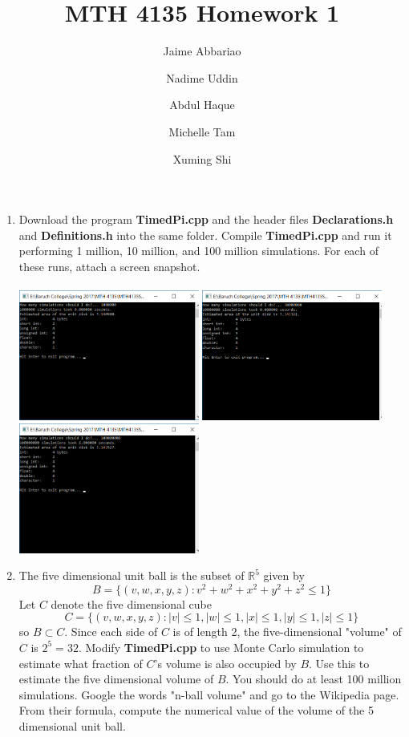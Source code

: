 \documentclass{article}
\author{Jaime Abbariao \and Nadime Uddin \and Abdul Haque \and Michelle Tam \and Xuming Shi}
\title{MTH 4135 Homework 1}
\date{}
\begin{document}
	\maketitle
	\begin{enumerate}
		\item Download the program \textbf{TimedPi.cpp} and the header files \textbf{Declarations.h} and \textbf{Definitions.h} into the same folder. Compile \textbf{TimedPi.cpp} and run it performing 1 million, 10 million, and 100 million simulations. For each of these runs, attach a screen snapshot.\\\\
		\includegraphics[width=16em]{Homework1_q1_1million.png}
		\includegraphics[width=16em]{Homework1_q1_10million.png}
		\includegraphics[width=16em]{Homework1_q1_100million.png}
		\item The five dimensional unit ball is the subset of $\mathbb{R}^5$ given by
		$$B = \lbrace (v, w, x, y, z): v^2 + w^2 + x^2 + y^2 + z^2 \leq 1 \rbrace$$
		Let $C$ denote the five dimensional cube $$C = \lbrace (v, w, x, y, z): |v| \leq 1, |w| \leq 1, |x| \leq 1, |y| \leq 1, |z| \leq 1 \rbrace$$
		so $B \subset C$. Since each side of $C$ is of length 2, the five-dimensional "volume" of $C$ is $2^5 = 32$. Modify \textbf{TimedPi.cpp} to use Monte Carlo simulation to estimate what fraction of $C$'s volume is also occupied by $B$. Use this to estimate the five dimensional volume of $B$. You should do at least 100 million simulations. Google the words "n-ball volume" and go to the Wikipedia page. From their formula, compute the numerical value of the volume of the 5 dimensional unit ball.\\

\end{enumerate}
\end{document}
